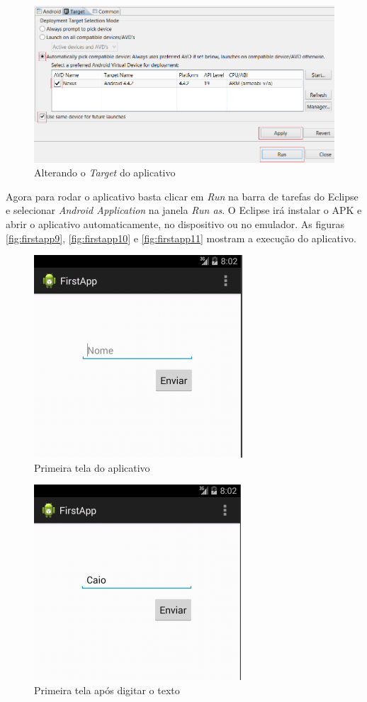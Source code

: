\documentclass[a4paper,12pt,brazil,oneside]{book}
\begin{document}
\begin{figure}[H]
  \centering
  \includegraphics[width=.7\textwidth]{figuras/emulador/AddEmulador4.png}
  \caption{Alterando o \emph{Target} do aplicativo}
  \label{fig:AddEmulador4}
\end{figure}


Agora para rodar o aplicativo basta clicar em \emph{Run} na barra de tarefas do Eclipse e selecionar \textit{Android Application} na janela \emph{Run as}. O Eclipse irá instalar o APK e abrir o aplicativo automaticamente, no dispositivo ou no emulador. As figuras \autoref{fig:firstapp9}, \autoref{fig:firstapp10} e \autoref{fig:firstapp11} mostram a execução do aplicativo.

\begin{figure}[H]
  \centering
  \includegraphics[width=.4\textwidth]{figuras/firstapp/firstapp9.png}
  \caption{Primeira tela do aplicativo}
  \label{fig:firstapp9}
\end{figure}

\begin{figure}[H]
  \centering
  \includegraphics[width=.4\textwidth]{figuras/firstapp/firstapp10.png}
  \caption{Primeira tela após digitar o texto}
  \label{fig:firstapp10}
\end{figure}
\end{document}
